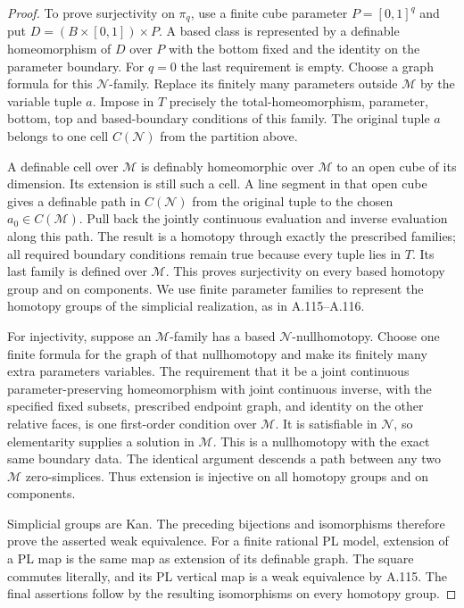 \begin{proof}
To prove surjectivity on $\pi_q$, use a finite cube parameter
$P=[0,1]^q$ and put $D=(B\times[0,1])\times P$.
A based class is represented by a definable homeomorphism of $D$ over
$P$ with the bottom fixed and the identity on the parameter boundary.
For $q=0$ the last requirement is empty. Choose a graph formula for
this $\mathcal N$-family. Replace its finitely many parameters outside
$\mathcal M$ by the variable tuple $a$. Impose in $T$ precisely the
total-homeomorphism, parameter, bottom, top and based-boundary
conditions of this family. The original tuple $a$ belongs to one cell
$C(\mathcal N)$ from the partition above.

A definable cell over $\mathcal M$ is definably homeomorphic over
$\mathcal M$ to an open cube of its dimension. Its extension is still
such a cell. A line segment in that open cube gives a definable path
in $C(\mathcal N)$ from the original tuple to the chosen
$a_0\in C(\mathcal M)$. Pull back the jointly continuous evaluation
and inverse evaluation along this path. The result is a homotopy
through exactly the prescribed families; all required boundary
conditions remain true because every tuple lies in $T$.
Its last family is defined over $\mathcal M$.
This proves surjectivity on every based homotopy group and on
components. We use finite parameter families to represent the
homotopy groups of the simplicial realization, as in A.115--A.116.

For injectivity, suppose an $\mathcal M$-family has a based
$\mathcal N$-nullhomotopy. Choose one finite formula for the graph
of that nullhomotopy and make its finitely many extra parameters
variables. The requirement that it be a joint continuous
parameter-preserving homeomorphism with joint continuous inverse,
with the specified fixed subsets, prescribed endpoint graph, and
identity on the other relative faces, is one first-order condition
over $\mathcal M$. It is satisfiable in $\mathcal N$, so
elementarity supplies a solution in $\mathcal M$. This is a
nullhomotopy with the exact same boundary data. The identical
argument descends a path between any two $\mathcal M$ zero-simplices.
Thus extension is injective on all homotopy groups and on components.

Simplicial groups are Kan. The preceding bijections and isomorphisms
therefore prove the asserted weak equivalence. For a finite rational
PL model, extension of a PL map is the same map as extension of its
definable graph. The square commutes literally, and its PL vertical
map is a weak equivalence by A.115. The final assertions follow by
the resulting isomorphisms on every homotopy group.
\end{proof}

